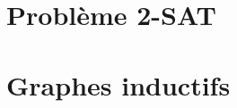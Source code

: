 \documentclass{tipe}
\begin{document}

\clearpage

\part{Problème 2-SAT}


\part{Graphes inductifs}



\end{document}
